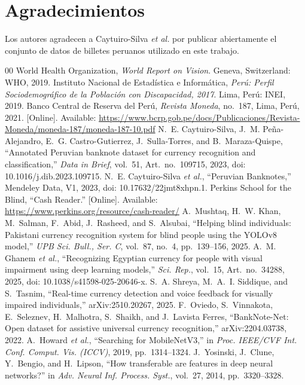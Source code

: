 \documentclass[conference,a4paper]{IEEEtran}
\begin{document}
\section*{Agradecimientos}

Los autores agradecen a Caytuiro-Silva \emph{et al.} por publicar abiertamente el conjunto de datos de billetes peruanos utilizado en este trabajo.

\begin{thebibliography}{00}
 World Health Organization, \emph{World Report on Vision}. Geneva, Switzerland: WHO, 2019.
 Instituto Nacional de Estadística e Informática, \emph{Perú: Perfil Sociodemográfico de la Población con Discapacidad, 2017}. Lima, Perú: INEI, 2019.
 Banco Central de Reserva del Perú, \emph{Revista Moneda}, no.~187, Lima, Perú, 2021. [Online]. Available: \url{https://www.bcrp.gob.pe/docs/Publicaciones/Revista-Moneda/moneda-187/moneda-187-10.pdf}
 N.~E. Caytuiro-Silva, J.~M. Peña-Alejandro, E.~G. Castro-Gutierrez, J.~Sulla-Torres, and B.~Maraza-Quispe, ``Annotated Peruvian banknote dataset for currency recognition and classification,'' \emph{Data in Brief}, vol.~51, Art.~no.~109715, 2023, doi: 10.1016/j.dib.2023.109715.
 N.~E. Caytuiro-Silva \emph{et al.}, ``Peruvian Banknotes,'' Mendeley Data, V1, 2023, doi: 10.17632/22jmt8xhpn.1.
 Perkins School for the Blind, ``Cash Reader.'' [Online]. Available: \url{https://www.perkins.org/resource/cash-reader/}
 A.~Mushtaq, H.~W. Khan, M.~Salman, F.~Abid, J.~Rasheed, and S.~Alsubai, ``Helping blind individuals: Pakistani currency recognition system for blind people using the YOLOv8 model,'' \emph{UPB Sci. Bull., Ser. C}, vol.~87, no.~4, pp.~139--156, 2025.
 A.~M. Ghanem \emph{et al.}, ``Recognizing Egyptian currency for people with visual impairment using deep learning models,'' \emph{Sci. Rep.}, vol.~15, Art.~no.~34288, 2025, doi: 10.1038/s41598-025-20646-x.
 S.~A. Shreya, M.~A.~I. Siddique, and S.~Tasnim, ``Real-time currency detection and voice feedback for visually impaired individuals,'' arXiv:2510.20267, 2025.
 F.~Oviedo, S.~Vinnakota, E.~Seleznev, H.~Malhotra, S.~Shaikh, and J.~Lavista Ferres, ``BankNote-Net: Open dataset for assistive universal currency recognition,'' arXiv:2204.03738, 2022.
 A.~Howard \emph{et al.}, ``Searching for MobileNetV3,'' in \emph{Proc. IEEE/CVF Int. Conf. Comput. Vis. (ICCV)}, 2019, pp.~1314--1324.
 J.~Yosinski, J.~Clune, Y.~Bengio, and H.~Lipson, ``How transferable are features in deep neural networks?'' in \emph{Adv. Neural Inf. Process. Syst.}, vol.~27, 2014, pp.~3320--3328.

\end{thebibliography}
\end{document}
